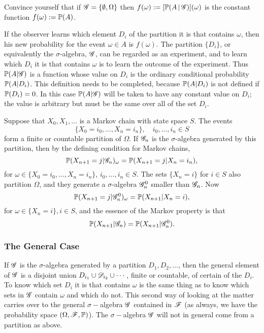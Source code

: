 \begin{exercise}
Convince yourself that if $\mathcal{G} = \left\{ \emptyset, \Omega \right \}$ then $f(\omega) := [\mathbb{P}(A\,|\,\mathcal{G})](\omega)$ is the constant function $f(\omega) := \mathbb{P}(A)$.
\end{exercise}

If the observer learns which element $D_i$ of the partition it is that contains $\omega$, then his new probability for the event $\omega \in A$ is $f(\omega)$. The partition $\{D_i\}$, or equivalently the $\sigma$-algebra, $\mathcal{G}$, can be regarded as an experiment, and to learn which $D_i$ it is that contains $\omega$ is to learn the outcome of the experiment. Thus $\mathbb{P}(A | \mathcal{G})$ is a function whose value on $D_i$ is the ordinary conditional probability $\mathbb{P}(A | D_i)$. This definition needs to be completed, because $\mathbb{P}(A | D_i)$ is not defined if $\mathbb{P}(D_i) = 0$. In this case $\mathbb{P}(A | \mathcal{G})$ will be taken to have any constant value on $D_i$; the value is arbitrary but must be the same over all of the set $D_i$.
\begin{example}
Suppose that $X_0, X_1, \dots$ is a Markov chain with state space $S$. The events
\begin{equation*}
    \{ X_0 = i_0,\dots, X_n = i_n \}, \quad i_0,\dots, i_n \in S
\end{equation*}
form a finite or countable partition of $\Omega$. If $\mathcal{G}_n$ is the $\sigma$-algebra generated by this partition, then by the defining condition for Markov chains, 
\begin{equation*}
    \mathbb{P}(X_{n+1} = j | \mathcal{G}_n)_\omega = \mathbb{P}(X_{n+1} = j|X_n = i_n),
\end{equation*}
for $\omega \in \{ X_0 = i_0,\dots, X_n = i_n \}$, $i_0,\dots, i_n \in S$. The sets $\{X_n = i \}$ for $i\in S$ also partition $\Omega$, and they generate a $\sigma$-algebra $\mathcal{G}_n^0$ smaller than $\mathcal{G}_n$. Now 
\begin{equation*}
    \mathbb{P}(X_{n+1} = j | \mathcal{G}_n^0)_\omega = \mathbb{P}(X_{n+1} | X_n = i),
\end{equation*}
for $\omega \in \{X_n = i\}, i \in S$, and the essence of the Markov property is that 
\begin{equation*}
    \mathbb{P}(X_{n+1} | \mathcal{G}_n) = \mathbb{P}(X_{n+1}|\mathcal{G}_n^0).
\end{equation*}
\end{example} 
\subsubsection{The General Case}
If $\mathcal{G}$ is the $\sigma$-algebra generated by a partition $D_1, D_2, \dots$, then the general element of $\mathcal{G}$ is a disjoint union $D_{i_1} \cup \mathcal{D}_{i_2} \cup \cdots$, finite or countable, of certain of the $D_i$. To know which set $D_i$ it is that contains $\omega$ is the same thing as to know which sets in $\mathcal{G}$ contain $\omega$ and which do not. This second way of looking at the matter carries over to the general $\sigma-$algebra $\mathcal{G}$ contained in $\mathcal{F}$ (as always, we have the probability space $(\Omega, \mathcal{F}, \mathbb{P})$). The $\sigma-$algebra $\mathcal{G}$ will not in general come from a partition as above.\\

